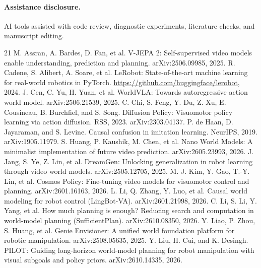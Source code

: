 \documentclass[11pt]{article}
\begin{document}
\paragraph{Assistance disclosure.} AI tools assisted with code review, diagnostic experiments, literature checks, and manuscript editing.

{\small
\begin{thebibliography}{21}
 M. Assran, A. Bardes, D. Fan, et al. V-JEPA 2: Self-supervised video models enable understanding, prediction and planning. arXiv:2506.09985, 2025.
 R. Cadene, S. Alibert, A. Soare, et al. LeRobot: State-of-the-art machine learning for real-world robotics in PyTorch. \url{https://github.com/huggingface/lerobot}, 2024.
 J. Cen, C. Yu, H. Yuan, et al. WorldVLA: Towards autoregressive action world model. arXiv:2506.21539, 2025.
 C. Chi, S. Feng, Y. Du, Z. Xu, E. Cousineau, B. Burchfiel, and S. Song. Diffusion Policy: Visuomotor policy learning via action diffusion. RSS, 2023. arXiv:2303.04137.
 P. de Haan, D. Jayaraman, and S. Levine. Causal confusion in imitation learning. NeurIPS, 2019. arXiv:1905.11979.
 S. Huang, P. Kaushik, M. Chen, et al. Nano World Models: A minimalist implementation of future video prediction. arXiv:2605.23993, 2026.
 J. Jang, S. Ye, Z. Lin, et al. DreamGen: Unlocking generalization in robot learning through video world models. arXiv:2505.12705, 2025.
 M. J. Kim, Y. Gao, T.-Y. Lin, et al. Cosmos Policy: Fine-tuning video models for visuomotor control and planning. arXiv:2601.16163, 2026.
 L. Li, Q. Zhang, Y. Luo, et al. Causal world modeling for robot control (LingBot-VA). arXiv:2601.21998, 2026.
 C. Li, S. Li, Y. Yang, et al. How much planning is enough? Reducing search and computation in world-model planning (SufficientPlan). arXiv:2610.08350, 2026.
 Y. Liao, P. Zhou, S. Huang, et al. Genie Envisioner: A unified world foundation platform for robotic manipulation. arXiv:2508.05635, 2025.
 Y. Liu, H. Cui, and K. Desingh. PILOT: Guiding long-horizon world-model planning for robot manipulation with visual subgoals and policy priors. arXiv:2610.14335, 2026.

\end{thebibliography}}
\end{document}
